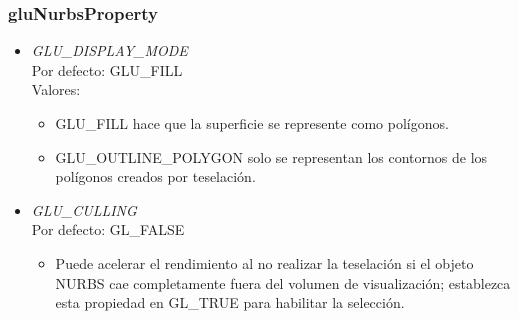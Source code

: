\documentclass[10.5pt]{beamer}
\begin{document}
\begin{frame}[fragile]
\frametitle{gluNurbsProperty}
\small

\begin{itemize}
    \item \emph{GLU\_DISPLAY\_MODE}\\
        Por defecto: GLU\_FILL \\
        Valores:\\
        \begin{itemize}
            \item GLU\_FILL hace que la superficie se represente como polígonos.
            \item GLU\_OUTLINE\_POLYGON solo se representan los
            contornos de los polígonos creados por teselación.
        \end{itemize}
    \item \emph{GLU\_CULLING}\\
        Por defecto: GL\_FALSE \\
        \begin{itemize}
            \item Puede acelerar el rendimiento al
            no realizar la teselación si el objeto NURBS cae completamente
            fuera del volumen de visualización; establezca esta propiedad
            en GL\_TRUE para habilitar la selección.
        \end{itemize}
\end{itemize}

\end{frame}

\end{document}
